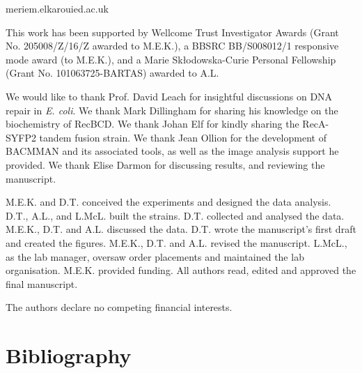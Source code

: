 \documentclass[times, twoside]{zHenriquesLab-StyleBioRxiv}
\begin{document}
\begin{corrauthor}
    meriem.elkaroui\at ed.ac.uk
\end{corrauthor}









\begin{funding}
    This work has been supported by Wellcome Trust Investigator Awards (Grant No. 205008/Z/16/Z awarded to M.E.K.), a BBSRC BB/S008012/1 responsive mode award (to M.E.K.), and a Marie Skłodowska-Curie Personal Fellowship (Grant No. 101063725-BARTAS) awarded to A.L.
\end{funding}

\begin{acknowledgements}
    We would like to thank Prof. David Leach for insightful discussions on DNA repair in \emph{E. coli}. We thank Mark Dillingham for sharing his knowledge on the biochemistry of RecBCD. We thank Johan Elf for kindly sharing the RecA-SYFP2 tandem fusion strain. We thank Jean Ollion for the development of BACMMAN and its associated tools, as well as the image analysis support he provided. We thank Elise Darmon for discussing results, and reviewing the manuscript.
\end{acknowledgements}

\begin{contributions}
    M.E.K. and D.T. conceived the experiments and designed the data analysis. D.T., A.L., and L.McL. built the strains. D.T. collected and analysed the data. M.E.K., D.T. and A.L. discussed the data. D.T. wrote the manuscript's first draft and created the figures. M.E.K., D.T. and A.L. revised the manuscript. L.McL., as the lab manager, oversaw order placements and maintained the lab organisation. M.E.K. provided funding. All authors read, edited and approved the final manuscript.
\end{contributions}

\begin{interests}
    The authors declare no competing financial interests.
\end{interests}

\section*{Bibliography}


\onecolumn
\newpage


\end{document}
